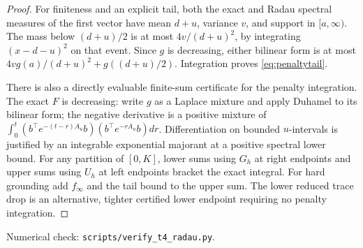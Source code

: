\documentclass[11pt]{article}
\begin{document}
\begin{proof}
For finiteness and an explicit tail, both the exact and Radau spectral
measures of the first vector have mean $d+u$, variance $v$, and
support in $[a,\infty)$. The mass below $(d+u)/2$ is at most
$4v/(d+u)^2$, by integrating $(x-d-u)^2$ on that event.
Since $g$ is decreasing, either bilinear form is at most
$4v g(a)/(d+u)^2+g((d+u)/2)$. Integration proves
\eqref{eq:penaltytail}.

There is also a directly evaluable finite-sum certificate for the
penalty integration. The exact $F$ is decreasing: write $g$ as a
Laplace mixture and apply Duhamel to its bilinear form; the negative
derivative is a positive mixture of
$\int_0^t (b^\top e^{-(t-r)A_u}b)(b^\top e^{-rA_u}b)dr$.
Differentiation on bounded $u$-intervals is justified by an integrable
exponential majorant at a positive spectral lower bound.
For any partition of $[0,K]$, lower sums using $G_h$ at right endpoints
and upper sums using $U_h$ at left endpoints bracket the exact integral.
For hard grounding add $f_\infty$ and the tail bound to the upper sum.
The lower reduced trace drop is an alternative, tighter certified
lower endpoint requiring no penalty integration.
\end{proof}
\noindent Numerical check: \texttt{scripts/verify\_t4\_radau.py}.
\end{document}
